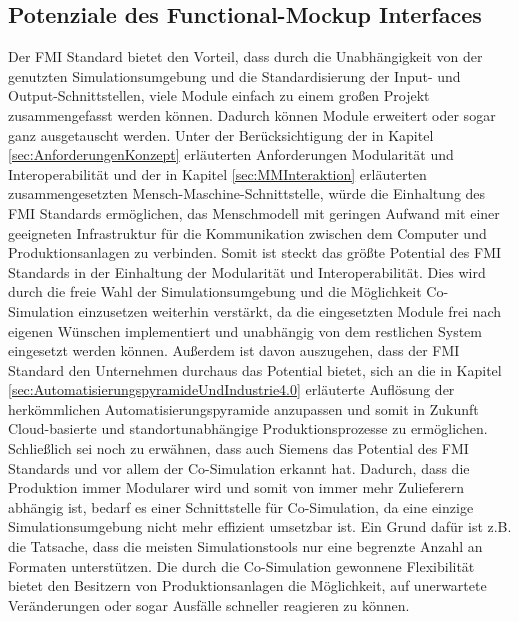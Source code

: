 \subsection{Potenziale des Functional-Mockup Interfaces}\label{sec:PotenzialeFMU}
Der FMI Standard bietet den Vorteil, dass durch die Unabhängigkeit von der genutzten Simulationsumgebung und die Standardisierung der Input- und Output-Schnittstellen, viele Module einfach zu einem großen Projekt zusammengefasst werden können. Dadurch können Module erweitert oder sogar ganz ausgetauscht werden.
Unter der Berücksichtigung der in Kapitel \ref{sec:AnforderungenKonzept} erläuterten Anforderungen Modularität und Interoperabilität und der in Kapitel \ref{sec:MMInteraktion} erläuterten zusammengesetzten Mensch-Maschine-Schnittstelle, würde die Einhaltung des FMI Standards ermöglichen, das Menschmodell mit geringen Aufwand mit einer geeigneten Infrastruktur für die Kommunikation zwischen dem Computer und Produktionsanlagen zu verbinden.
\newline
Somit ist steckt das größte Potential des FMI Standards in der Einhaltung der Modularität und Interoperabilität. Dies wird durch die freie Wahl der Simulationsumgebung und die Möglichkeit Co-Simulation einzusetzen weiterhin verstärkt, da die eingesetzten Module frei nach eigenen Wünschen implementiert und unabhängig von dem restlichen System eingesetzt werden können. Außerdem ist davon auszugehen, dass der FMI Standard den Unternehmen durchaus das Potential bietet, sich an die in Kapitel \ref{sec:AutomatisierungspyramideUndIndustrie4.0} erläuterte Auflösung der herkömmlichen Automatisierungspyramide anzupassen und somit in Zukunft Cloud-basierte und standortunabhängige Produktionsprozesse zu ermöglichen.
\newline
Schließlich sei noch zu erwähnen, dass auch Siemens das Potential des FMI Standards und vor allem der Co-Simulation erkannt hat. Dadurch, dass die Produktion immer Modularer wird und somit von immer mehr Zulieferern abhängig ist, bedarf es einer Schnittstelle für Co-Simulation, da eine einzige Simulationsumgebung nicht mehr effizient umsetzbar ist. Ein Grund dafür ist z.B. die Tatsache, dass die meisten Simulationstools nur eine begrenzte Anzahl an Formaten unterstützen. Die durch die Co-Simulation gewonnene Flexibilität bietet den Besitzern von Produktionsanlagen die Möglichkeit, auf unerwartete Veränderungen oder sogar Ausfälle schneller reagieren zu können\cite[S.13]{27}. 

